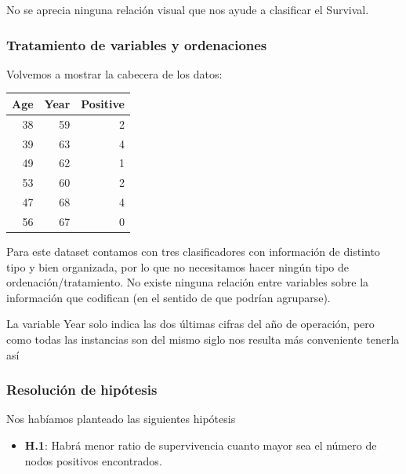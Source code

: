 No se aprecia ninguna relación visual que nos ayude a clasificar el Survival.

\newpage

\subsubsection{Tratamiento de variables y ordenaciones}

Volvemos a mostrar la cabecera de los datos:

\vspace{\baselineskip}

\begin{tabular}{r|r|r}
\hline
Age & Year & Positive\\
\hline
38 & 59 & 2\\
\hline
39 & 63 & 4\\
\hline
49 & 62 & 1\\
\hline
53 & 60 & 2\\
\hline
47 & 68 & 4\\
\hline
56 & 67 & 0\\
\hline
\end{tabular}

\vspace{\baselineskip}

Para este dataset contamos con tres clasificadores con información de distinto tipo y bien organizada, por lo que no necesitamos hacer ningún tipo de ordenación/tratamiento. No existe ninguna relación entre variables sobre la información que codifican (en el sentido de que
podrían agruparse).

La variable Year solo indica las dos últimas cifras del año de operación, pero como todas las instancias son del mismo siglo nos resulta más conveniente tenerla así

\subsubsection{Resolución de hipótesis}

Nos habíamos planteado las siguientes hipótesis

\begin{itemize}
    \item \textbf{H.1}: Habrá menor ratio de supervivencia cuanto mayor sea el número de nodos positivos encontrados.
\end{itemize}

